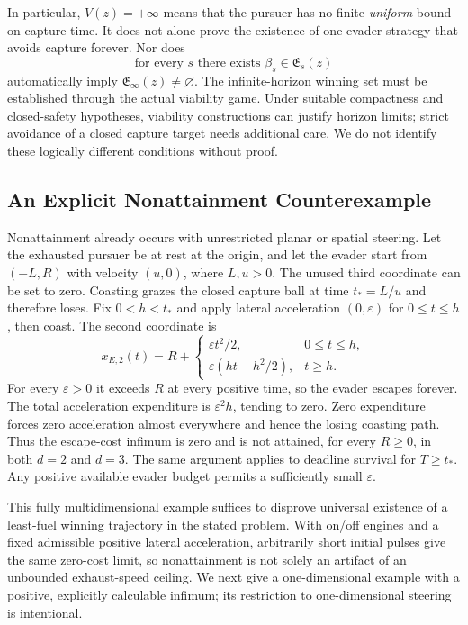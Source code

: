 \documentclass[journal,a4paper]{IEEEtran}
\begin{document}
In particular, $V(z)=+\infty$ means that the pursuer has no finite \emph{uniform} bound on capture time. It does not alone prove the existence of one evader strategy that avoids capture forever. Nor does
\begin{equation}
 \text{for every }s\text{ there exists }\beta_s\in\mathfrak E_s(z)
\end{equation}
automatically imply $\mathfrak E_\infty(z)\ne\varnothing$. The infinite-horizon winning set must be established through the actual viability game. Under suitable compactness and closed-safety hypotheses, viability constructions can justify horizon limits; strict avoidance of a closed capture target needs additional care. We do not identify these logically different conditions without proof.

\subsection{An Explicit Nonattainment Counterexample}
\label{sec:nonattain}
Nonattainment already occurs with unrestricted planar or spatial steering. Let the exhausted pursuer be at rest at the origin, and let the evader start from $(-L,R)$ with velocity $(u,0)$, where $L,u>0$. The unused third coordinate can be set to zero. Coasting grazes the closed capture ball at time $t_*=L/u$ and therefore loses. Fix $0<h<t_*$ and apply lateral acceleration $(0,\varepsilon)$ for $0\le t\le h$, then coast. The second coordinate is
\begin{equation}
 x_{E,2}(t)=R+
 \begin{cases}
 \varepsilon t^2/2,&0\le t\le h,\\
 \varepsilon(ht-h^2/2),&t\ge h.
 \end{cases}
\end{equation}
For every $\varepsilon>0$ it exceeds $R$ at every positive time, so the evader escapes forever. The total acceleration expenditure is $\varepsilon^2h$, tending to zero. Zero expenditure forces zero acceleration almost everywhere and hence the losing coasting path. Thus the escape-cost infimum is zero and is not attained, for every $R\ge0$, in both $d=2$ and $d=3$. The same argument applies to deadline survival for $T\ge t_*$. Any positive available evader budget permits a sufficiently small $\varepsilon$.

This fully multidimensional example suffices to disprove universal existence of a least-fuel winning trajectory in the stated problem. With on/off engines and a fixed admissible positive lateral acceleration, arbitrarily short initial pulses give the same zero-cost limit, so nonattainment is not solely an artifact of an unbounded exhaust-speed ceiling. We next give a one-dimensional example with a positive, explicitly calculable infimum; its restriction to one-dimensional steering is intentional.
\end{document}
